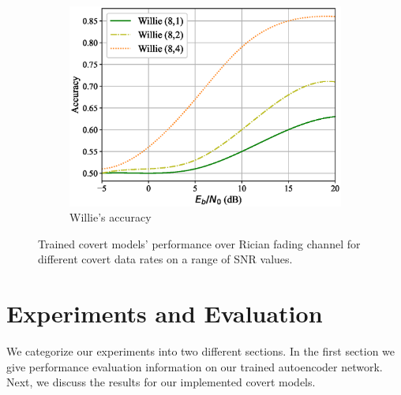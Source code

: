 \begin{figure}
\begin{subfigure}{0.3\textwidth}
		\includegraphics[width=\linewidth]{figs/willie_accuracy_rician}
		\caption{Willie's accuracy}
		\label{fig:rician_resutls_willie}
	\end{subfigure}
	\caption{Trained covert models' performance over Rician fading channel for different covert data rates on a range of SNR values.}
	\label{fig:rician_resutls}
\end{figure}

\section{Experiments and Evaluation}
\label{s:eval}
We categorize our experiments into two different sections. In the first section we give performance evaluation information on our trained autoencoder network. Next, we discuss the results for our implemented covert models.


